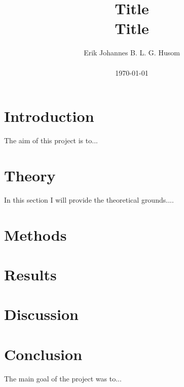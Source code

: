 \documentclass[10pt, a4paper]{amsart}
\title[Title]{Title \\ \large
Title}
\author[Husom]{Erik Johannes B. L. G. Husom \\ \\ \today}
\numberwithin{figure}{section}
\numberwithin{table}{section}
\begin{document}
\begin{abstract}
\end{abstract}


\maketitle


\tableofcontents

\section{Introduction}
The aim of this project is to...


\section{Theory}
In this section I will provide the theoretical grounds...\cite{jensen}.


\section{Methods}

\section{Results}

\section{Discussion}

\section{Conclusion}
The main goal of the project was to...

%
%
%
%
%
%







\end{document}
